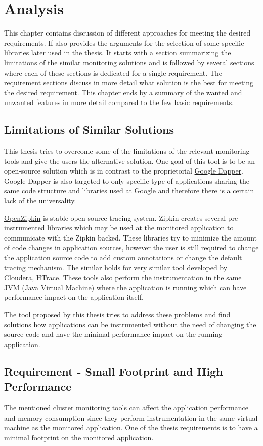 \chapter{Analysis}
\label{analysis}
This chapter contains discussion of different approaches for meeting the desired requirements. If also provides the arguments for the selection of some specific libraries later used in the thesis. It starts with a section summarizing the limitations of the similar monitoring solutions and is followed by several sections where each of these sections is dedicated for a single requirement. The requirement sections discuss in more detail what solution is the best for meeting the desired requirement. This chapter ends by a summary of the wanted and unwanted features in more detail compared to the few basic requirements.

\section{Limitations of Similar Solutions}
This thesis tries to overcome some of the limitations of the relevant monitoring tools and give the users the alternative solution. One goal of this tool is to be an open-source solution which is in contrast to the proprietorial \hyperref[dapper]{Google Dapper}. Google Dapper is also targeted to only specific type of applications sharing the same code structure and libraries used at Google and therefore there is a certain lack of the universality. 

\hyperref[zipkin]{OpenZipkin} is stable open-source tracing system. Zipkin creates several pre-instrumented libraries which may be used at the monitored application to communicate with the Zipkin backed. These libraries try to minimize the amount of code changes in application sources, however the user is still required to change the application source code to add custom annotations or change the default tracing mechanism. The similar holds for very similar tool developed by Cloudera, \hyperref[htrace]{HTrace}. These tools also perform the instrumentation in the same JVM (Java Virtual Machine) where the application is running which can have performance impact on the application itself.

The tool proposed by this thesis tries to address these problems and find solutions how applications can be instrumented without the need of changing the source code and have the minimal performance impact on the running application.
\section{Requirement - Small Footprint and High Performance}
The mentioned cluster monitoring tools can affect the application performance and memory consumption since they perform instrumentation in the same virtual machine as the monitored application. One of the thesis requirements is to have  a minimal footprint on the monitored application.

